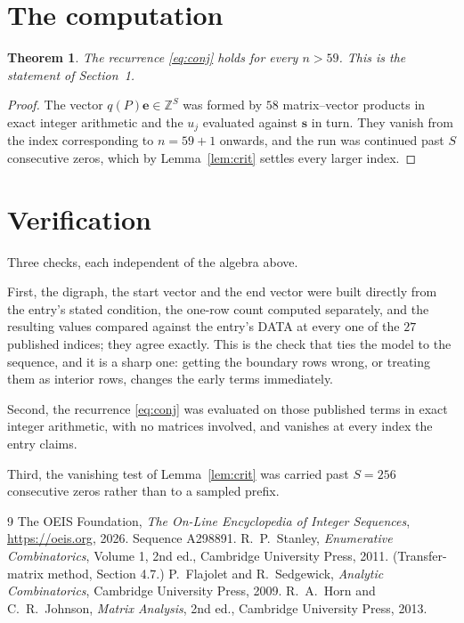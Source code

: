 \documentclass[11pt,a4paper]{article}
\theoremstyle{plain}
\newtheorem{theorem}{Theorem}
\theoremstyle{definition}
\begin{document}
\section{The computation}

\begin{theorem}
The recurrence \eqref{eq:conj} holds for every $n>59$. This is the statement of
Section~1.
\end{theorem}

\begin{proof}
The vector $q(P)\mathbf{e}\in\mathbb{Z}^{S}$ was formed by $58$ matrix--vector
products in exact integer arithmetic and the $u_j$ evaluated against $\mathbf{s}$ in turn.
They vanish from the index corresponding to $n=59+1$ onwards, and the run was continued
past $S$ consecutive zeros, which by Lemma~\ref{lem:crit} settles every larger index.
\end{proof}

\section{Verification}

Three checks, each independent of the algebra above.

First, the digraph, the start vector and the end vector were built directly from the
entry's stated condition, the one-row count computed separately, and the resulting values
compared against the entry's DATA at every one of the $27$ published indices; they
agree exactly. This is the check that ties the model to the sequence, and it is a sharp one:
getting the boundary rows wrong, or treating them as interior rows, changes the early terms
immediately.

Second, the recurrence \eqref{eq:conj} was evaluated on those published terms in exact
integer arithmetic, with no matrices involved, and vanishes at every index the entry claims.

Third, the vanishing test of Lemma~\ref{lem:crit} was carried past $S=256$ consecutive
zeros rather than to a sampled prefix.

\begin{thebibliography}{9}
 The OEIS Foundation, \emph{The On-Line Encyclopedia of Integer
Sequences}, \url{https://oeis.org}, 2026. Sequence A298891.
 R.~P.~Stanley, \emph{Enumerative Combinatorics}, Volume 1, 2nd ed.,
Cambridge University Press, 2011. (Transfer-matrix method, Section 4.7.)
 P.~Flajolet and R.~Sedgewick, \emph{Analytic Combinatorics}, Cambridge
University Press, 2009.
 R.~A.~Horn and C.~R.~Johnson, \emph{Matrix Analysis}, 2nd ed., Cambridge
University Press, 2013.
\end{thebibliography}
\end{document}
